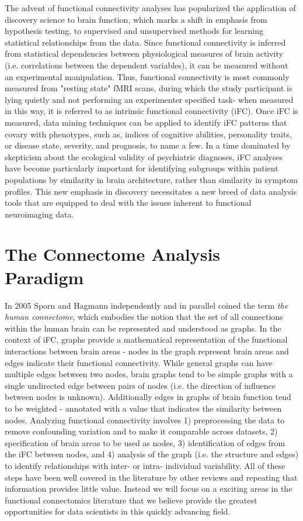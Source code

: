The advent of functional connectivity analyses has popularized the application of discovery science to brain function, which marks a shift in emphasis from hypothesis testing, to supervised and unsupervised methods for learning statistical relationships from the data. Since functional connectivity is inferred from statistical dependencies between physiological measures of brain activity (i.e. correlations between the dependent variables), it can be measured without an experimental manipulation. Thus, functional connectivity is most commonly measured from "resting state" fMRI scans, during which the study participant is lying quietly and not performing an experimenter specified task- when measured in this way, it is referred to as intrinsic functional connectivity (iFC). Once iFC is measured, data mining techniques can be applied to identify iFC patterns that covary with phenotypes, such as, indices of cognitive abilities, personality traits, or disease state, severity, and prognosis, to name a few. In a time dominated by skepticism about the ecological validity of psychiatric diagnoses, iFC analyses have become particularly important for identifying subgroups within patient populations by similarity in brain architecture, rather than similarity in symptom profiles. This new emphasis in discovery necessitates a new breed of data analysis tools that are equipped to deal with the issues inherent to functional neuroimaging data.

\section{The Connectome Analysis Paradigm}

In 2005 Sporn and Hagmann \cite{Sporns2005,Hagmann2005} independently and in parallel coined the term \textit{the human connectome}, which embodies the notion that the set of all connections within the human brain can be represented and understood as graphs. In the context of iFC, graphs provide a mathematical representation of the functional interactions between brain areas -  nodes in the graph represent brain areas and edges indicate their functional connectivity. While general graphs can have multiple edges between two nodes, brain graphs tend to be simple graphs with a single undirected edge between pairs of nodes (i.e. the direction of influence between nodes is unknown). Additionally edges in graphs of brain function tend to be weighted - annotated with a value that indicates the similarity between nodes. Analyzing functional connectivity involves 1) preprocessing the data to remove confounding variation and to make it comparable across datasets, 2) specification of brain areas to be used as nodes, 3) identification of edges from the iFC between nodes, and 4) analysis of the graph (i.e. the structure and edges) to identify relationships with inter- or intra- individual variability. All of these steps have been well covered in the literature  by other reviews and repeating that information provides little value. Instead we will focus on a exciting areas in the functional connectomics literature that we believe provide the greatest opportunities for data scientists in this quickly advancing field.

